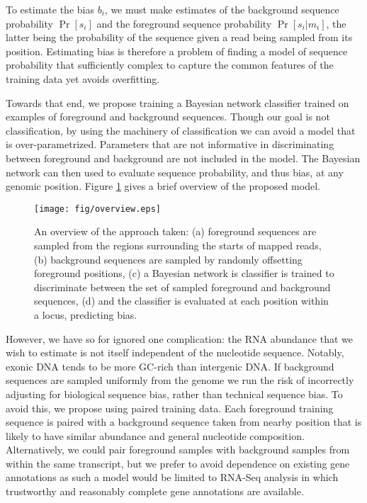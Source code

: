 \documentclass{bioinfo}
\begin{document}
To estimate the bias $b_i$, we must make estimates of the background sequence
probability $\Pr[s_i]$ and the foreground sequence probability $\Pr[ s_i | m_i
]$, the latter being the probability of the sequence given a read being sampled
from its position. Estimating bias is therefore a problem of finding a model of
sequence probability that sufficiently complex to capture the common features of
the training data yet avoids overfitting.

Towards that end, we propose training a Bayesian network classifier trained on
examples of foreground and background sequences. Though our goal is not
classification, by using the machinery of classification we can avoid a model
that is over-parametrized. Parameters that are not informative in
discriminating between foreground and background are not included in the model.
The Bayesian network can then used to evaluate sequence probability, and thus
bias, at any genomic position. Figure \ref{fig:overview} gives a brief overview
of the proposed model.

\begin{figure}
\centerline{\texttt{[image: fig/overview.eps]}}
\caption{An overview of the approach taken: (a) foreground sequences are sampled
from the regions surrounding the starts of mapped reads, (b) background
sequences are sampled by randomly offsetting foreground positions, (c) a
Bayesian network is classifier is trained to discriminate between the set of
sampled foreground and background sequences, (d) and the classifier is evaluated
at each position within a locus, predicting bias.}
\label{fig:overview}
\end{figure}

However, we have so for ignored one complication: the RNA abundance that we wish
to estimate is not itself independent of the nucleotide sequence. Notably,
exonic DNA tends to be more GC-rich than intergenic DNA. If background sequences
are sampled uniformly from the genome we run the risk of incorrectly adjusting
for biological sequence bias, rather than technical sequence bias.  To avoid
this, we propose using paired training data. Each foreground training
sequence is paired with a background sequence taken from nearby position
that is likely to have similar abundance and general nucleotide composition.
Alternatively, we could pair foreground samples with background samples from
within the same transcript, but we prefer to avoid dependence on existing
gene annotations as such a model would be limited to RNA-Seq analysis in which
trustworthy and reasonably complete gene annotations are available.
\end{document}
